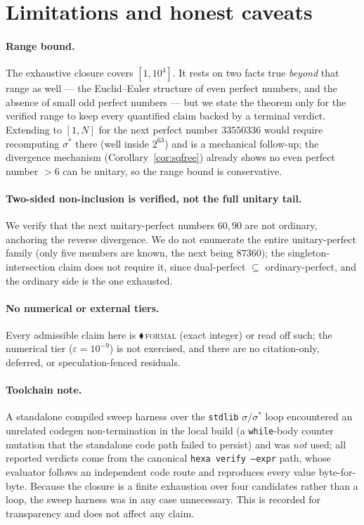 \documentclass[11pt,a4paper]{article}
\newcommand{\sig}{\sigma}
\newcommand{\sigs}{\sigma^{*}}
\newcommand{\formal}{\textcolor{blue!60!black}{$\blacklozenge$}}
\theoremstyle{plain}
\theoremstyle{definition}
\begin{document}
\section{Limitations and honest caveats}
\label{sec:limits}

\paragraph{Range bound.} The exhaustive closure covers $[1,10^4]$. It rests on
two facts true \emph{beyond} that range as well --- the Euclid--Euler structure
of even perfect numbers, and the absence of small odd perfect numbers --- but we
state the theorem only for the verified range to keep every quantified claim
backed by a terminal verdict. Extending to $[1,N]$ for the next perfect number
$33550336$ would require recomputing $\sigs$ there (well inside $2^{63}$) and is
a mechanical follow-up; the divergence mechanism (Corollary~\ref{cor:sqfree})
already shows no even perfect number $>6$ can be unitary, so the range bound is
conservative.

\paragraph{Two-sided non-inclusion is verified, not the full unitary tail.} We
verify that the next unitary-perfect numbers $60,90$ are not ordinary, anchoring
the reverse divergence. We do not enumerate the entire unitary-perfect family
(only five members are known, the next being $87360$); the singleton-intersection
claim does not require it, since dual-perfect $\subseteq$ ordinary-perfect, and
the ordinary side is the one exhausted.

\paragraph{No numerical or external tiers.} Every admissible claim here is
\formal\,\textsc{formal} (exact integer) or read off such; the numerical tier
($\varepsilon=10^{-9}$) is not exercised, and there are no citation-only,
deferred, or speculation-fenced residuals.

\paragraph{Toolchain note.} A standalone compiled sweep harness over the
\texttt{stdlib} $\sig/\sigs$ loop encountered an unrelated codegen
non-termination in the local build (a \texttt{while}-body counter mutation that
the standalone code path failed to persist) and was \emph{not} used; all
reported verdicts come from the canonical \texttt{hexa verify --expr} path,
whose evaluator follows an independent code route and reproduces every value
byte-for-byte. Because the closure is a finite exhaustion over four candidates
rather than a loop, the sweep harness was in any case unnecessary. This is
recorded for transparency and does not affect any claim.
\end{document}
